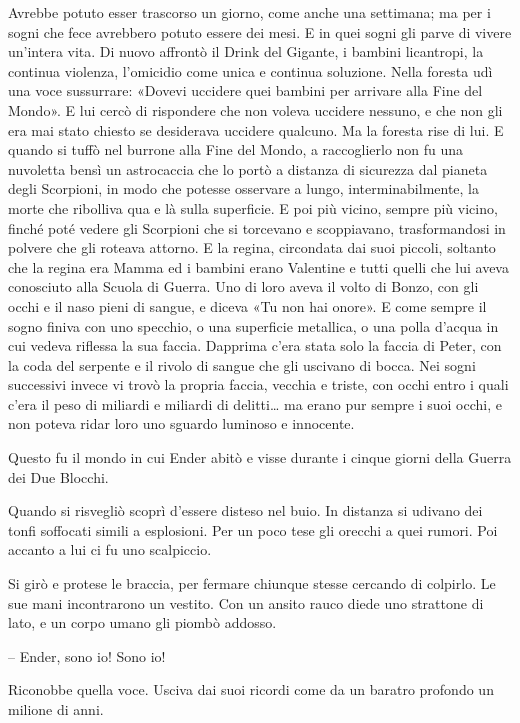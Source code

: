 {Avrebbe potuto esser trascorso un giorno, come anche una settimana; ma
	per i sogni che fece avrebbero potuto essere dei mesi. E in quei sogni
	gli parve di vivere un'intera vita. Di nuovo affrontò il Drink del
	Gigante, i bambini licantropi, la continua violenza, l'omicidio come
	unica e continua soluzione. Nella foresta udì una voce sussurrare:
	«Dovevi uccidere quei bambini per arrivare alla Fine del Mondo». E lui
	cercò di rispondere che non voleva uccidere nessuno, e che non gli era
	mai stato chiesto se desiderava uccidere qualcuno. Ma la foresta rise di
	lui. E quando si tuffò nel burrone alla Fine del Mondo, a raccoglierlo
	non fu una nuvoletta bensì un astrocaccia che lo portò a distanza di
	sicurezza dal pianeta degli Scorpioni, in modo che potesse osservare a
	lungo, interminabilmente, la morte che ribolliva qua e là sulla
	superficie. E poi più vicino, sempre più vicino, finché poté vedere gli
	Scorpioni che si torcevano e scoppiavano, trasformandosi in polvere che
	gli roteava attorno. E la regina, circondata dai suoi piccoli, soltanto
	che la regina era Mamma ed i bambini erano Valentine e tutti quelli che
	lui aveva conosciuto alla Scuola di Guerra. Uno di loro aveva il volto
	di Bonzo, con gli occhi e il naso pieni di sangue, e diceva «Tu non hai
	onore». E come sempre il sogno finiva con uno specchio, o una superficie
	metallica, o una polla d'acqua in cui vedeva riflessa la sua faccia.
	Dapprima c'era stata solo la faccia di Peter, con la coda del serpente e
	il rivolo di sangue che gli uscivano di bocca. Nei sogni successivi
	invece vi trovò la propria faccia, vecchia e triste, con occhi entro i
	quali c'era il peso di miliardi e miliardi di delitti\ldots{} ma erano
	pur sempre i suoi occhi, e non poteva ridar loro uno sguardo luminoso e
	innocente.}

{Questo fu il mondo in cui Ender abitò e visse durante i cinque giorni
	della Guerra dei Due Blocchi.}

{Quando si risvegliò scoprì d'essere disteso nel buio. In distanza si
	udivano dei tonfi soffocati simili a esplosioni. Per un poco tese gli
	orecchi a quei rumori. Poi accanto a lui ci fu uno scalpiccio.}

{Si girò e protese le braccia, per fermare chiunque stesse cercando di
	colpirlo. Le sue mani incontrarono un vestito. Con un ansito rauco diede
	uno strattone di lato, e un corpo umano gli piombò addosso.}

{-- Ender, sono io! Sono io!}

{Riconobbe quella voce. Usciva dai suoi ricordi come da un baratro
	profondo un milione di anni.}

